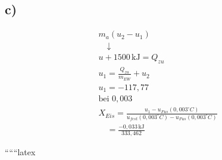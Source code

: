 

\subsection*{c)}

\[
\begin{aligned}
    &m_{a} (u_2 - u_1) \\
    &\quad \downarrow \\
    &u + 1500 \, \text{kJ} = Q_{zu} \\
    &u_1 = \frac{Q_{zu}}{m_{EW}} + u_2 \\
    &u_1 = -117,77 \\
    &\text{bei } 0,003 \\
    &X_{Eis} = \frac{u_1 - u_{Fus}(0,003^\circ C)}{u_{fest}(0,003^\circ C) - u_{Fus}(0,003^\circ C)} \\
    &\quad = \frac{-0,033 \, \text{kJ}}{333,462}
\end{aligned}
\]

``````latex